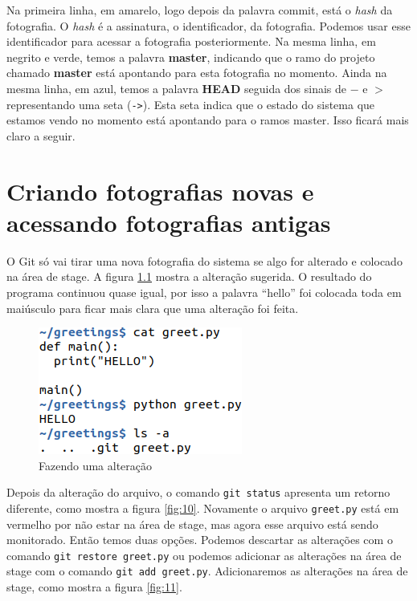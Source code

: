 \documentclass[a4paper]{book}
\begin{document}
Na primeira linha, em amarelo, logo depois da palavra commit,
está o \textit{hash} da fotografia.
O \textit{hash} é a assinatura, o identificador, da fotografia.
Podemos usar esse identificador para acessar a fotografia
posteriormente. Na mesma linha, em negrito e verde, temos a
palavra \textbf{master},
indicando que o ramo do projeto chamado \textbf{master} está
apontando para esta fotografia no momento.
Ainda na mesma linha, em azul, temos a palavra \textbf{HEAD} 
seguida
dos sinais de $-$ e $>$ representando uma seta (\texttt{->}).
Esta seta indica que o estado do sistema que estamos vendo no
momento está apontando para o ramos master.
Isso ficará mais claro a seguir.

\chapter{Criando fotografias novas e acessando fotografias antigas}

O Git só vai tirar uma nova fotografia do sistema se algo for 
alterado e colocado na área de stage.
A figura \ref{fig:09} mostra a alteração sugerida.
O resultado do programa continuou quase igual, por isso
a palavra ``hello'' foi colocada toda em maiúsculo 
para ficar mais clara que uma alteração foi feita.

\begin{figure}[ht]
\caption{Fazendo uma alteração}
\label{fig:09}
\centering
\includegraphics[scale=0.6]{"images/09-Fazendo uma alteração.png"}
\end{figure}

Depois da alteração do arquivo, o comando \texttt{git status}
apresenta um retorno diferente, como mostra a figura 
\ref{fig:10}.
Novamente o arquivo \texttt{greet.py} está em vermelho
por não estar na área de stage,
mas agora esse arquivo está sendo monitorado. 
Então temos duas opções.
Podemos descartar as alterações com o comando 
\texttt{git restore greet.py} ou podemos adicionar 
as alterações na área de stage com o comando
\texttt{git add greet.py}.
Adicionaremos as alterações na área de stage, como mostra a
figura \ref{fig:11}.
\end{document}

